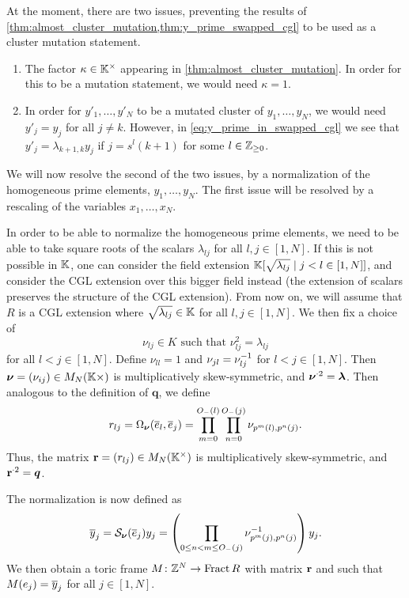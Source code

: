 At the moment, there are two issues, preventing the results of
\cref{thm:almost_cluster_mutation,thm:y_prime_swapped_cgl} to be used as a cluster
mutation statement.

\begin{enumerate}
	\item The factor $\kappa \in \mathbb{K}^\times$ appearing in \cref{thm:almost_cluster_mutation}. In
	      order for this to be a mutation statement, we would need $\kappa = 1$.
	\item In order for $y'_1, \dots, y'_N$ to be a mutated cluster of $y_1, \dots, y_N$, we would
	      need $y'_j = y_j$ for all $j \neq k$. However, in \cref{eq:y_prime_in_swapped_cgl} we
	      see that $y'_j = \lambda_{k+1,k}y_j$ if $j = s^l(k+1)$ for some $l \in \mathbb{Z}_{\geq 0}$.
\end{enumerate}

We will now resolve the second of the two issues, by a normalization of the homogeneous
prime elements, $y_1, \dots, y_N$. The first issue will be resolved by a rescaling of
the variables $x_1, \dots, x_N$.

In order to be able to normalize the homogeneous prime elements, we need to be able to
take square roots of the scalars $\lambda_{lj}$ for all $l,j \in [1, N]$. If this is
not possible in $\mathbb{K}$, one can consider the field extension $\mathbb{K}[\sqrt{\lambda_{lj}}
		\mid j < l \in [1, N]]$, and consider the CGL extension over this bigger field instead
(the extension of scalars preserves the structure of the CGL extension). From now on,
we will assume that $R$ is a CGL extension where $\sqrt{\lambda_{lj}} \in \mathbb{K}$ for all
$l, j \in [1, N]$. We then fix a choice of
\begin{equation*}
	\nu_{lj} \in K \text{ such that } \nu^2_{lj} = \lambda_{lj}
\end{equation*}
%
for all $l < j \in [1, N]$. Define $\nu_{ll} = 1$ and $\nu_{jl} = \nu_{lj}^{-1}$ for $l
	< j \in [1, N]$. Then $\boldsymbol{\nu} = (\nu_{ij}) \in M_N(\mathbb{K}\times)$ is multiplicatively
skew-symmetric, and $\boldsymbol{\nu}^{\cdot 2} = \boldsymbol{\lambda}$. Then analogous to the
definition of $\mathbf{q}$, we define
\begin{equation*}
	r_{lj} = \Omega_{\boldsymbol{\nu}}(\overline{e}_l, \overline{e}_j) = \prod_{m=0}^{O_{-}(l)}\prod_{n=0}^{O_{-}(j)}\nu_{p^m(l), p^n(j)}.
\end{equation*}
%
Thus, the matrix $\mathbf{r} = (r_{lj}) \in M_N(\mathbb{K}^\times)$ is multiplicatively
skew-symmetric, and $\mathbf{r}^{\cdot 2} = \boldsymbol{q}$.

The normalization is now defined as
\begin{equation*}
	\overline{y}_j = \mathcal{S}_{\boldsymbol{\nu}}(\overline{e}_j) y_j = \left(\prod_{0 \leq n < m \leq O_{-}(j)}\nu^{-1}_{p^m(j),p^n(j)}\right) y_j.
\end{equation*}
%
We then obtain a toric frame $M \colon \mathbb{Z}^N \to \operatorname{Fract}{R}$ with matrix $\mathbf{r}$ and
such that $M(e_j) = \overline{y}_j$ for all $j \in [1, N]$.

